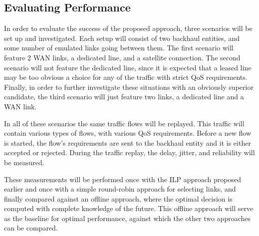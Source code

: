 \subsection{Evaluating Performance}

In order to evaluate the success of the proposed approach, three scenarios will be set up and investigated. Each setup will consist of two backhaul entities, and some number of emulated links going between them. The first scenario will feature 2 WAN links, a dedicated line, and a satellite connection. The second scenario will not feature the dedicated line, since it is expected that a leased line may be too obvious a choice for any of the traffic with strict QoS requirements. Finally, in order to further investigate these situations with an obviously superior candidate, the third scenario will just feature two links, a dedicated line and a WAN link.

In all of these scenarios the same traffic flows will be replayed. This traffic will contain various types of flows, with various QoS requirements. Before a new flow is started, the flow's requirements are sent to the backhaul entity and it is either accepted or rejected. During the traffic replay, the delay, jitter, and reliability will be measured.

These measurements will be performed once with the ILP approach proposed earlier and once with a simple round-robin approach for selecting links, and finally compared against an offline approach, where the optimal decision is computed with complete knowledge of the future. This offline approach will serve as the baseline for optimal performance, against which the other two approaches can be compared.







\nocite{tsai2006review}
\nocite{tao2005improving}
\nocite{kundel2022user}
\nocite{goldenberg2004optimizing}
\nocite{lange2015performance}
\nocite{tarique2009survey}
\nocite{tschoke2021time}
\nocite{ganichev2010yamr}
\nocite{habib2007improving}
\nocite{guo2004experiences}
\nocite{akella2003measurement}
\nocite{ergencc2021reliability}
\nocite{tao2004application}
\nocite{alwan2010multi}
\nocite{prados2021asynchronous}
\nocite{zhang2016fundamentals}
\nocite{chen2020collaborative}
\nocite{akella2008performance}
\nocite{andreoli2017mobile}
\nocite{huang2008multiconstrained}



